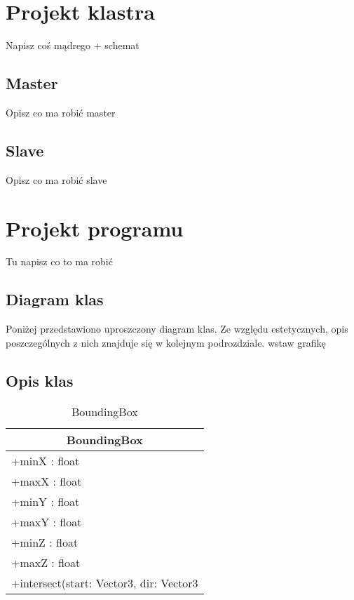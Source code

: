 \section{Projekt klastra}

	Napisz coś mądrego + schemat
	
	\subsection{Master} Opisz co ma robić master
	\subsection{Slave} Opisz co ma robić slave
\section{Projekt programu}

	Tu napisz co to ma robić
	
	\subsection{Diagram klas}
	
	Poniżej przedstawiono uproszczony diagram klas. Ze względu estetycznych, opis poszczególnych z nich znajduje się w kolejnym podrozdziale. wstaw grafikę
	
	
	\subsection{Opis klas}

\begin{longtable}{|p{16cm}|}
	\caption{BoundingBox} \label{tab:BoundingBox} \\ \hline
	\multicolumn{1}{|c|}{BoundingBox} \\ \hline
    +minX : float \\
    +maxX : float \\
    +minY : float \\
    +maxY : float \\
    +minZ : float \\
    +maxZ : float \\ \hline
    +intersect(start: Vector3, dir: Vector3 \\ \hline
\end{longtable}


